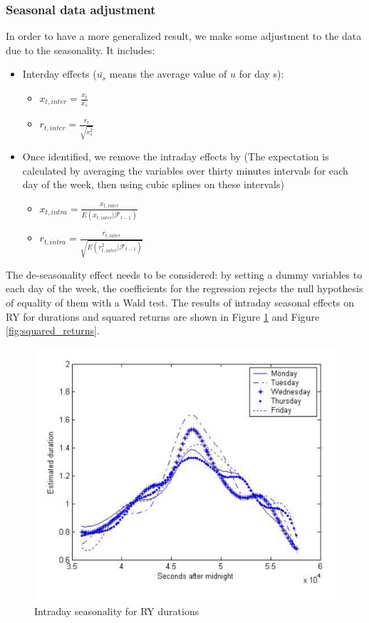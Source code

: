 \documentclass[12pt, a4paper]{article}
\begin{document}
\subsubsection{Seasonal data adjustment}
In order to have a more generalized result, we make some adjustment to the data due to the seasonality. It includes:
\begin{itemize}
    \item Interday effects ($\bar{u_s}$ means the average value of $u$ for day s):
    \begin{itemize}
        \item $x_{t, inter} = \frac{x_t}{\bar{x_s}}$
        \item $r_{t, inter} = \frac{r_t}{\sqrt{\bar{r^2_s}}}$
    \end{itemize}
    \item Once identified, we remove the intraday effects by (The expectation is calculated by averaging the variables over thirty minutes intervals for each day of the week, then  using cubic splines on these intervals)
    \begin{itemize}
        \item $x_{t, intra} = \frac{x_{t, inter}}{E(x_{t, inter} | \mathcal{F}_{t-1})}$
        \item $r_{t, intra} = \frac{r_{t, inter}}{\sqrt{E(r^2_{t, inter} | \mathcal{F}_{t-1})}}$
    \end{itemize}
\end{itemize}
The de-seasonality effect needs to be considered: by setting a dummy variables to each day of the week, the coefficients for the regression rejects the null hypothesis of equality of them with a Wald test. The results of intraday seasonal effects on RY for durations and squared returns are shown in Figure \ref{fig:durations} and Figure \ref{fig:squared_returns}.
\begin{figure}[htpf!]
    \centering
    \includegraphics[scale=0.3]{Seasonality.png}
    \caption{Intraday seasonality for RY durations}
    \label{fig:durations}
\end{figure}
\end{document}
